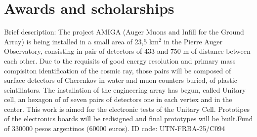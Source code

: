 \documentclass[11pt, a4paper]{moderncv}
\begin{document}
\clearpage
%

\section{Awards and scholarships}

{Brief description: The project AMIGA (Auger Muons and Infill for the Ground Array) is being installed in a small area of 23,5 km$^2$ in the Pierre Auger
Observatory, consisting in pair of detectors of 433 and 750 m of distance between each other. Due to the requisits of good energy resolution and primary
mass compisiton identification of the cosmic ray, those pairs will be composed of surface detectors of Cherenkov in water and muon counters buried, of 
plastic scintillators. The installation of the engineering array has begun, called Unitary cell, an hexagon of of seven pairs of detectors one in each 
vertex and in the center. This work is aimed for the electronic tests of the Unitary Cell. Prototipes of the electronics boards will be redisigned and 
final prototypes will be built.}{}{Fund of 330000 pesos argentinos (60000 euros). ID code: UTN-FRBA-25/C094}

\end{document}
